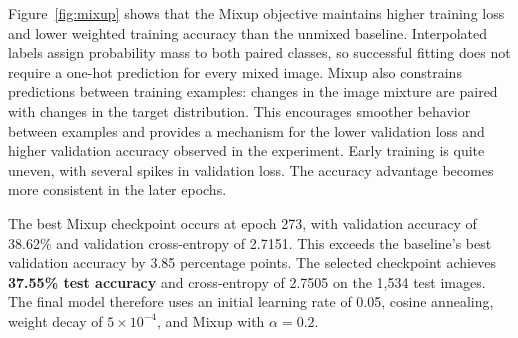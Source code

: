 \documentclass[letterpaper]{article}
\begin{document}
Figure~\ref{fig:mixup} shows that the Mixup objective maintains higher training loss and lower weighted training accuracy than the unmixed baseline. Interpolated labels assign probability mass to both paired classes, so successful fitting does not require a one-hot prediction for every mixed image. Mixup also constrains predictions between training examples: changes in the image mixture are paired with changes in the target distribution. This encourages smoother behavior between examples and provides a mechanism for the lower validation loss and higher validation accuracy observed in the experiment. Early training is quite uneven, with several spikes in validation loss. The accuracy advantage becomes more consistent in the later epochs.

The best Mixup checkpoint occurs at epoch 273, with validation accuracy of 38.62\% and validation cross-entropy of 2.7151. This exceeds the baseline's best validation accuracy by 3.85 percentage points. The selected checkpoint achieves \textbf{37.55\% test accuracy} and cross-entropy of 2.7505 on the 1,534 test images. The final model therefore uses an initial learning rate of 0.05, cosine annealing, weight decay of $5\times10^{-4}$, and Mixup with $\alpha=0.2$.


\end{document}
